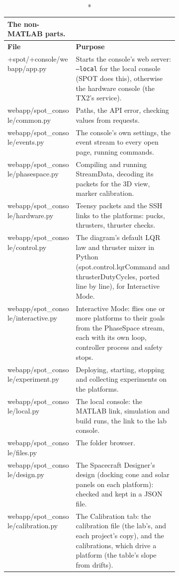 \documentclass[11pt,a4paper]{article}
\begin{document}
\begin{xltabular}{\linewidth}{@{}>{\raggedright\arraybackslash\ttfamily\footnotesize}p{0.40\linewidth} >{\raggedright\arraybackslash\small}X@{}}
\caption*{The non-MATLAB parts.}\\
\toprule \normalfont\small\textbf{File} & \textbf{Purpose} \\ \midrule \endhead
+spot/\allowbreak{}+console/\allowbreak{}webapp/\allowbreak{}app.py & Starts the console's web server: \texttt{--local} for the local console (SPOT does this), otherwise the hardware console (the TX2's service). \\
webapp/\allowbreak{}spot\_console/\allowbreak{}common.py & Paths, the API error, checking values from requests. \\
webapp/\allowbreak{}spot\_console/\allowbreak{}events.py & The console's own settings, the event stream to every open page, running commands. \\
webapp/\allowbreak{}spot\_console/\allowbreak{}phasespace.py & Compiling and running StreamData, decoding its packets for the 3D view, marker calibration. \\
webapp/\allowbreak{}spot\_console/\allowbreak{}hardware.py & Teensy packets and the SSH links to the platforms: pucks, thrusters, thruster checks. \\
webapp/\allowbreak{}spot\_console/\allowbreak{}control.py & The diagram's default LQR law and thruster mixer in Python (spot.control.lqrCommand and thrusterDutyCycles, ported line by line), for Interactive Mode. \\
webapp/\allowbreak{}spot\_console/\allowbreak{}interactive.py & Interactive Mode: flies one or more platforms to their goals from the PhaseSpace stream, each with its own loop, controller process and safety stops. \\
webapp/\allowbreak{}spot\_console/\allowbreak{}experiment.py & Deploying, starting, stopping and collecting experiments on the platforms. \\
webapp/\allowbreak{}spot\_console/\allowbreak{}local.py & The local console: the MATLAB link, simulation and build runs, the link to the lab console. \\
webapp/\allowbreak{}spot\_console/\allowbreak{}files.py & The folder browser. \\
webapp/\allowbreak{}spot\_console/\allowbreak{}design.py & The Spacecraft Designer's design (docking cone and solar panels on each platform): checked and kept in a JSON file. \\
webapp/\allowbreak{}spot\_console/\allowbreak{}calibration.py & The Calibration tab: the calibration file (the lab's, and each project's copy), and the calibrations, which drive a platform (the table's slope from drifts). \\

\end{xltabular}
\end{document}
